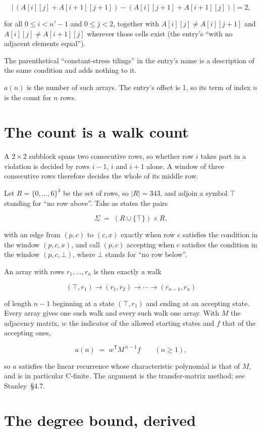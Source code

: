\documentclass[11pt]{article}
\theoremstyle{definition}
\begin{document}
\[\bigl|\,(A[i][j] + A[i{+}1][j{+}1]) - (A[i][j{+}1] + A[i{+}1][j])\,\bigr| = 2,\]

for all $0 \le i < n'-1$ and $0 \le j < 2$, together with $A[i][j] \ne A[i][j{+}1]$ and $A[i][j] \ne A[i{+}1][j]$ wherever those cells exist (the entry's ``with no adjacent elements equal'').

The parenthetical ``constant-stress tilings'' in the entry's name is a description of the same condition and adds nothing to it.

$a(n)$ is the number of such arrays. The entry's offset is 1, so its term of index $n$ is the count for $n$ rows.

\section{The count is a walk count}

A $2 \times 2$ subblock spans two consecutive rows, so whether row $i$ takes part in a violation is decided by rows $i-1$, $i$ and $i+1$ alone. A window of three consecutive rows therefore decides the whole of its middle row.

Let $R = \{0,\dots,6\}^{3}$ be the set of rows, so $|R| = 343$, and adjoin a symbol $\top$ standing for ``no row above''. Take as states the pairs

\[\Sigma \;=\; (R \cup \{\top\}) \times R,\]

with an edge from $(p,c)$ to $(c,x)$ exactly when row $c$ satisfies the condition in the window $(p,c,x)$, and call $(p,c)$ accepting when $c$ satisfies the condition in the window $(p,c,\bot)$, where $\bot$ stands for ``no row below''.

An array with rows $r_1,\dots,r_n$ is then exactly a walk

\[(\top,r_1) \to (r_1,r_2) \to \cdots \to (r_{n-1},r_n)\]

of length $n-1$ beginning at a state $(\top,r_1)$ and ending at an accepting state. Every array gives one such walk and every such walk one array. With $M$ the adjacency matrix, $w$ the indicator of the allowed starting states and $f$ that of the accepting ones,

\[a(n) \;=\; w^{\mathsf T} M^{\,n-1} f \qquad (n \ge 1),\]

so $a$ satisfies the linear recurrence whose characteristic polynomial is that of $M$, and is in particular C-finite. The argument is the transfer-matrix method; see Stanley~\S4.7.

\section{The degree bound, derived}
\end{document}
